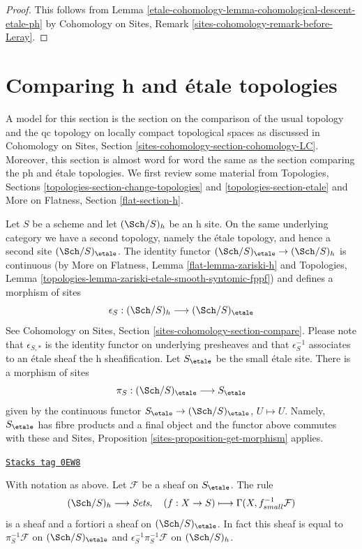 \begin{proof}
This follows from Lemma \ref{etale-cohomology-lemma-cohomological-descent-etale-ph}
by Cohomology on Sites, Remark \ref{sites-cohomology-remark-before-Leray}.
\end{proof}

\section{Comparing h and \'etale topologies}
\label{etale-cohomology-section-h-etale}
A model for this section is the section on the comparison of the
usual topology and the qc topology on locally compact topological
spaces as discussed in
Cohomology on Sites, Section \ref{sites-cohomology-section-cohomology-LC}.
Moreover, this section is almost word for word the same as the
section comparing the ph and \'etale topologies.
We first review some material from
Topologies, Sections
\ref{topologies-section-change-topologies} and
\ref{topologies-section-etale} and
More on Flatness, Section \ref{flat-section-h}.

\medskip\noindent
Let $S$ be a scheme and let $(\Sch/S)_h$ be an h site.
On the same underlying category we have a second topology,
namely the \'etale topology, and hence a second site
$(\Sch/S)_\etale$. The identity functor
$(\Sch/S)_\etale \to (\Sch/S)_h$ is continuous
(by More on Flatness, Lemma \ref{flat-lemma-zariski-h}
and Topologies, Lemma
\ref{topologies-lemma-zariski-etale-smooth-syntomic-fppf})
and defines a morphism of sites
$$
\epsilon_S : (\Sch/S)_h \longrightarrow (\Sch/S)_\etale
$$
See Cohomology on Sites, Section \ref{sites-cohomology-section-compare}.
Please note that $\epsilon_{S, *}$ is the identity functor on underlying
presheaves and that $\epsilon_S^{-1}$ associates to an \'etale sheaf the
h sheafification. Let $S_\etale$ be the small \'etale site.
There is a morphism of sites
$$
\pi_S : (\Sch/S)_\etale \longrightarrow S_\etale
$$
given by the continuous functor
$S_\etale \to (\Sch/S)_\etale$, $U \mapsto U$.
Namely, $S_\etale$ has fibre products and a final object and the
functor above commutes with these and
Sites, Proposition \ref{sites-proposition-get-morphism} applies.

\begin{lemma}
\label{etale-cohomology-lemma-describe-pullback-pi-h}
\href{https://stacks.math.columbia.edu/tag/0EW8}{\texttt{Stacks tag 0EW8}}

With notation as above.
Let $\mathcal{F}$ be a sheaf on $S_\etale$. The rule
$$
(\Sch/S)_h \longrightarrow \textit{Sets},\quad
(f : X \to S) \longmapsto \Gamma(X, f_{small}^{-1}\mathcal{F})
$$
is a sheaf and a fortiori a sheaf on $(\Sch/S)_\etale$.
In fact this sheaf is equal to
$\pi_S^{-1}\mathcal{F}$ on $(\Sch/S)_\etale$ and
$\epsilon_S^{-1}\pi_S^{-1}\mathcal{F}$ on $(\Sch/S)_h$.
\end{lemma}

